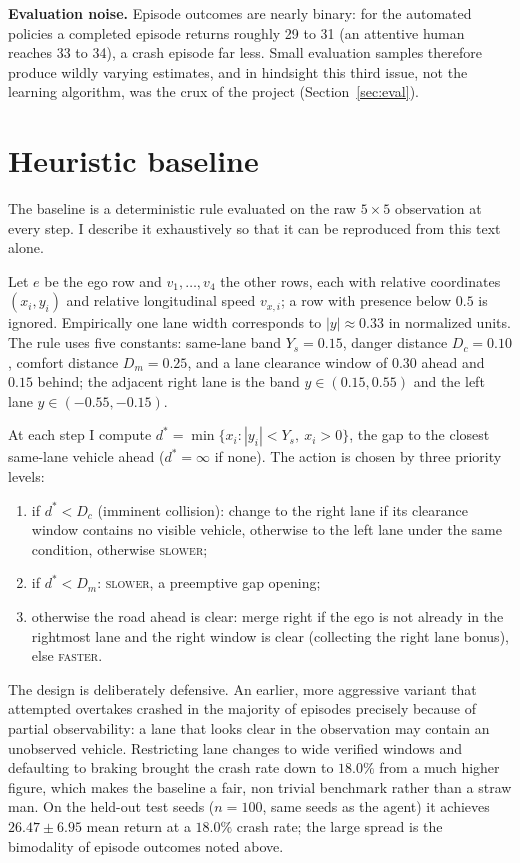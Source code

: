 \documentclass{article}
\newcommand{\basemean}{26.47}
\newcommand{\basestd}{6.95}
\newcommand{\basecrash}{18.0}
\begin{document}
\textbf{Evaluation noise.} Episode outcomes are nearly binary: for the automated policies a completed episode returns roughly 29 to 31 (an attentive human reaches 33 to 34), a crash episode far less. Small evaluation samples therefore produce wildly varying estimates, and in hindsight this third issue, not the learning algorithm, was the crux of the project (Section~\ref{sec:eval}).

\section{Heuristic baseline}
\label{sec:baseline}

The baseline is a deterministic rule evaluated on the raw $5\times 5$ observation at every step. I describe it exhaustively so that it can be reproduced from this text alone.

Let $e$ be the ego row and $v_1,\dots,v_4$ the other rows, each with relative coordinates $(x_i,y_i)$ and relative longitudinal speed $v_{x,i}$; a row with presence below $0.5$ is ignored. Empirically one lane width corresponds to $|y|\approx 0.33$ in normalized units. The rule uses five constants: same-lane band $Y_s{=}0.15$, danger distance $D_c{=}0.10$, comfort distance $D_m{=}0.25$, and a lane clearance window of $0.30$ ahead and $0.15$ behind; the adjacent right lane is the band $y\in(0.15,0.55)$ and the left lane $y\in(-0.55,-0.15)$.

At each step I compute $d^\ast=\min\{x_i:|y_i|<Y_s,\ x_i>0\}$, the gap to the closest same-lane vehicle ahead ($d^\ast=\infty$ if none). The action is chosen by three priority levels:
\begin{enumerate}
  \item if $d^\ast<D_c$ (imminent collision): change to the right lane if its clearance window contains no visible vehicle, otherwise to the left lane under the same condition, otherwise \textsc{slower};
  \item if $d^\ast<D_m$: \textsc{slower}, a preemptive gap opening;
  \item otherwise the road ahead is clear: merge right if the ego is not already in the rightmost lane and the right window is clear (collecting the right lane bonus), else \textsc{faster}.
\end{enumerate}

The design is deliberately defensive. An earlier, more aggressive variant that attempted overtakes crashed in the majority of episodes precisely because of partial observability: a lane that looks clear in the observation may contain an unobserved vehicle. Restricting lane changes to wide verified windows and defaulting to braking brought the crash rate down to $\basecrash\%$ from a much higher figure, which makes the baseline a fair, non trivial benchmark rather than a straw man. On the held-out test seeds ($n{=}100$, same seeds as the agent) it achieves $\basemean\pm\basestd$ mean return at a $\basecrash\%$ crash rate; the large spread is the bimodality of episode outcomes noted above.
\end{document}
